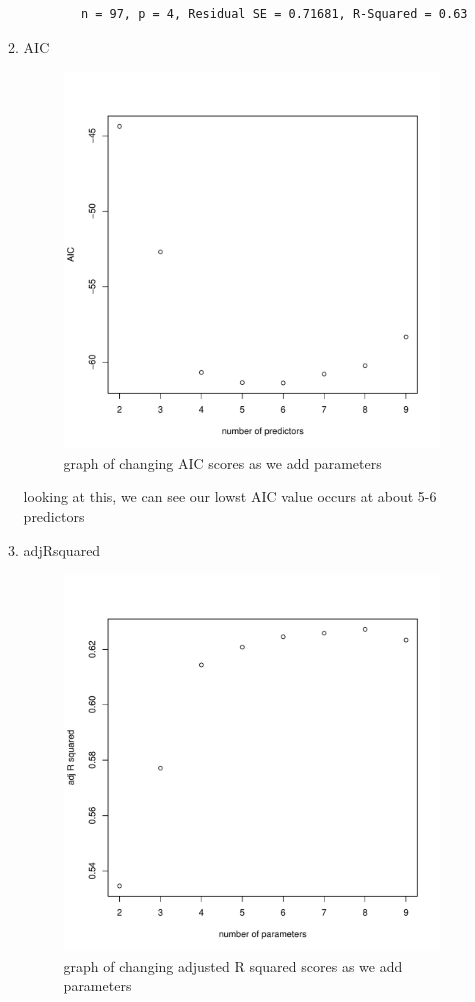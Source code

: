 \documentclass[11pt]{article}
\begin{document}
\begin{enumerate}
\begin{enumerate}
\begin{verbatim}
		n = 97, p = 4, Residual SE = 0.71681, R-Squared = 0.63
	\end{verbatim}
	\item AIC
	\begin{figure}[H]
		\centering
		\includegraphics[width=10cm,height=10cm]{aicforprostate}
		\caption[paic]{graph of changing AIC scores as we add parameters}
		\label{aicp}
	\end{figure}
	looking at this, we can see our lowst AIC value occurs at about 5-6 predictors
	\item adjRsquared
	\begin{figure}[H]
		\centering
		\includegraphics[width=10cm,height=10cm]{rsqrprostate}
		\caption[pr2]{graph of changing adjusted R squared scores as we add parameters}

\end{figure}
\end{enumerate}
\end{enumerate}
\end{document}
